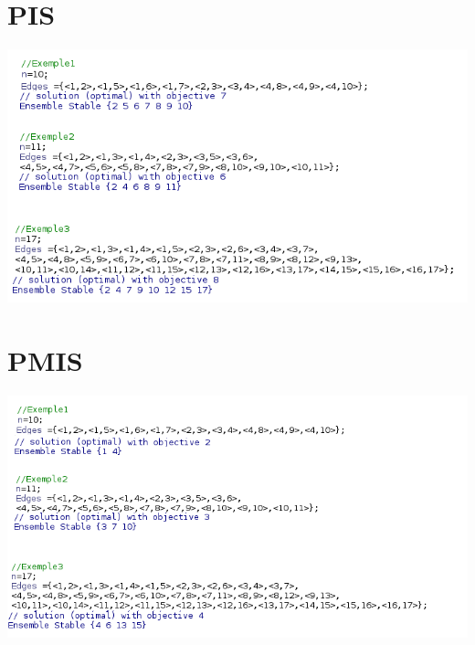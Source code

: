 \documentclass{article}\author{Arthur Delain}
\begin{document}
\section{PIS}
\includegraphics[scale=0.75]{PIS_ex.png} 
\section{PMIS}
\includegraphics[scale=0.75]{PMIS_ex.png} 
\end{document}
